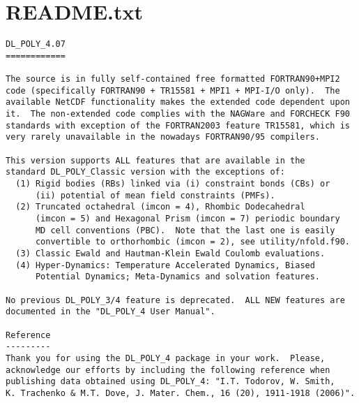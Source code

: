 \label{readme}
\section{README.txt}
\begin{verbatim}
DL_POLY_4.07
============

The source is in fully self-contained free formatted FORTRAN90+MPI2
code (specifically FORTRAN90 + TR15581 + MPI1 + MPI-I/O only).  The
available NetCDF functionality makes the extended code dependent upon
it.  The non-extended code complies with the NAGWare and FORCHECK F90
standards with exception of the FORTRAN2003 feature TR15581, which is
very rarely unavailable in the nowadays FORTRAN90/95 compilers.

This version supports ALL features that are available in the
standard DL_POLY_Classic version with the exceptions of:
  (1) Rigid bodies (RBs) linked via (i) constraint bonds (CBs) or
      (ii) potential of mean field constraints (PMFs).
  (2) Truncated octahedral (imcon = 4), Rhombic Dodecahedral
      (imcon = 5) and Hexagonal Prism (imcon = 7) periodic boundary
      MD cell conventions (PBC).  Note that the last one is easily
      convertible to orthorhombic (imcon = 2), see utility/nfold.f90.
  (3) Classic Ewald and Hautman-Klein Ewald Coulomb evaluations.
  (4) Hyper-Dynamics: Temperature Accelerated Dynamics, Biased
      Potential Dynamics; Meta-Dynamics and solvation features.

No previous DL_POLY_3/4 feature is deprecated.  ALL NEW features are
documented in the "DL_POLY_4 User Manual".

Reference
---------
Thank you for using the DL_POLY_4 package in your work.  Please,
acknowledge our efforts by including the following reference when
publishing data obtained using DL_POLY_4: "I.T. Todorov, W. Smith,
K. Trachenko & M.T. Dove, J. Mater. Chem., 16 (20), 1911-1918 (2006)".


\end{verbatim}
